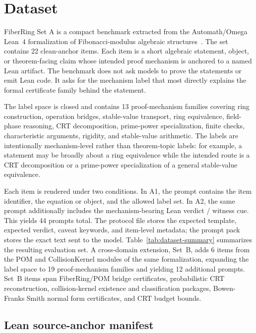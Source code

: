 \documentclass[11pt]{article}
\begin{document}
\section{Dataset}
\label{sec:dataset}

FiberRing Set A is a compact benchmark extracted from the
Automath/Omega Lean~4 formalization of Fibonacci-modulus algebraic
structures~\citep{omega2026automath}. The set contains 22 clean-anchor
items. Each item is a short algebraic statement, object, or theorem-facing
claim whose intended proof mechanism is anchored to a named Lean artifact.
The benchmark does not ask models to prove the statements or emit Lean
code. It asks for the mechanism label that most directly explains the
formal certificate family behind the statement.

The label space is closed and contains 13 proof-mechanism families covering
ring construction, operation bridges, stable-value transport, ring
equivalence, field-phase reasoning, CRT decomposition, prime-power
specialization, finite checks, characteristic arguments, rigidity, and
stable-value arithmetic. The labels are intentionally mechanism-level
rather than theorem-topic labels: for example, a statement may be broadly
about a ring equivalence while the intended route is a CRT decomposition or
a prime-power specialization of a general stable-value equivalence.

Each item is rendered under two conditions. In A1, the prompt contains the
item identifier, the equation or object, and the allowed label set. In A2,
the same prompt additionally includes the mechanism-bearing Lean verdict /
witness cue. This yields 44 prompts total. The protocol file stores the
expected template, expected verdict, caveat keywords, and item-level metadata;
the prompt pack stores the exact text sent to the model.
Table~\ref{tab:dataset-summary} summarizes the resulting evaluation set.
A cross-domain extension, Set~B, adds 6 items from the POM and
CollisionKernel modules of the same formalization, expanding the label
space to 19 proof-mechanism families and yielding 12 additional prompts.
Set~B items span FiberRing/POM bridge certificates, probabilistic CRT
reconstruction, collision-kernel existence and classification packages,
Bowen-Franks Smith normal form certificates, and CRT budget bounds.

\subsection{Lean source-anchor manifest}
\label{sec:source-anchor-manifest}
\end{document}
